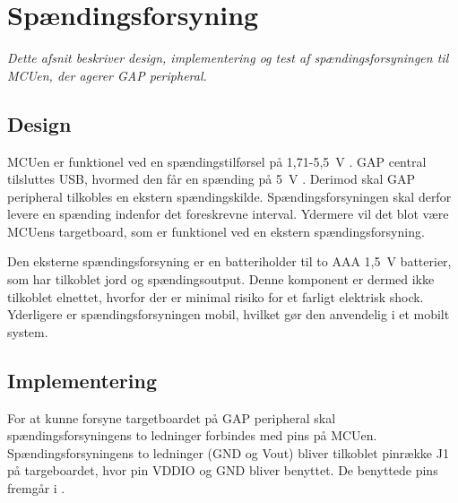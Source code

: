\section{Spændingsforsyning}\label{spaendingsforsyning}
\textit{Dette afsnit beskriver design, implementering og test af spændingsforsyningen til MCUen, der agerer GAP peripheral.}

\subsection{Design}
MCUen er funktionel ved en spændingstilførsel på 1,71-5,5~V \citep{Semiconductor20164200M,Semiconductor2016PRoC}. GAP central tilsluttes USB, hvormed den får en spænding på 5~V \citep{Semiconductor2016}. Derimod skal GAP peripheral tilkobles en ekstern spændingskilde. Spændingsforsyningen skal derfor levere en spænding indenfor det foreskrevne interval. Ydermere vil det blot være MCUens targetboard, som er funktionel ved en ekstern spændingsforsyning.

Den eksterne spændingsforsyning er en batteriholder til to AAA 1,5~V batterier, som har tilkoblet jord og spændingsoutput. Denne komponent er dermed ikke tilkoblet elnettet, hvorfor der er minimal risiko for et farligt elektrisk shock. Yderligere er spændingsforsyningen mobil, hvilket gør den anvendelig i et mobilt system.

\subsection{Implementering}
For at kunne forsyne targetboardet på GAP peripheral skal spændingsforsyningens to ledninger forbindes med pins på MCUen. Spændingsforsyningens to ledninger (GND og Vout) bliver tilkoblet pinrække J1 på targeboardet, hvor pin VDDIO og GND bliver benyttet. De benyttede pins fremgår i .

